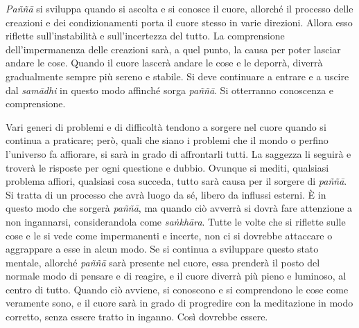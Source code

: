\emph{Paññā} si sviluppa quando si ascolta e si conosce il cuore,
allorché il processo delle creazioni e dei condizionamenti porta il
cuore stesso in varie direzioni. Allora esso riflette sull'instabilità e
sull'incertezza del tutto. La comprensione dell'impermanenza delle
creazioni sarà, a quel punto, la causa per poter lasciar andare le cose.
Quando il cuore lascerà andare le cose e le deporrà, diverrà
gradualmente sempre più sereno e stabile. Si deve continuare a entrare e
a uscire dal \emph{samādhi} in questo modo affinché sorga \emph{paññā}.
Si otterranno conoscenza e comprensione.

Vari generi di problemi e di difficoltà tendono a sorgere nel cuore
quando si continua a praticare; però, quali che siano i problemi che il
mondo o perfino l'universo fa affiorare, si sarà in grado di affrontarli
tutti. La saggezza li seguirà e troverà le risposte per ogni questione e
dubbio. Ovunque si mediti, qualsiasi problema affiori, qualsiasi cosa
succeda, tutto sarà causa per il sorgere di \emph{paññā}. Si tratta di
un processo che avrà luogo da sé, libero da influssi esterni. È in
questo modo che sorgerà \emph{paññā}, ma quando ciò avverrà si dovrà
fare attenzione a non ingannarsi, considerandola come \emph{saṅkhāra}.
Tutte le volte che si riflette sulle cose e le si vede come impermanenti
e incerte, non ci si dovrebbe attaccare o aggrappare a esse in alcun
modo. Se si continua a sviluppare questo stato mentale, allorché
\emph{paññā} sarà presente nel cuore, essa prenderà il posto del normale
modo di pensare e di reagire, e il cuore diverrà più pieno e luminoso,
al centro di tutto. Quando ciò avviene, si conoscono e si comprendono le
cose come veramente sono, e il cuore sarà in grado di progredire con la
meditazione in modo corretto, senza essere tratto in inganno. Così
dovrebbe essere.

